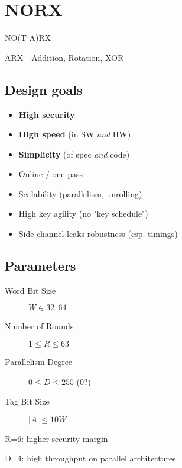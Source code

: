 \section{NORX}

NO(T A)RX

ARX - Addition, Rotation, XOR

\subsection{Design goals}

\begin{itemize}
  \item \textbf{High security}
  \item \textbf{High speed} (in SW \textit{and} HW)
  \item \textbf{Simplicity} (of spec \textit{and} code)
  \item Online / one-pass
  \item Scalability (parallelism, unrolling)
  \item High key agility (no "key schedule")
  \item Side-channel leaks robustness (esp. timings)
\end{itemize}

\subsection{Parameters}

\begin{description}
  \item[Word Bit Size] $W \in {32, 64}$
  \item[Number of Rounds] $1 \leq R \leq 63$
  \item[Parallelism Degree] $0 \leq D \leq 255$ (0?)
  \item[Tag Bit Size] $|A| \leq 10W$
\end{description}



R=6: higher security margin

D=4: high throughput on parallel architectures
